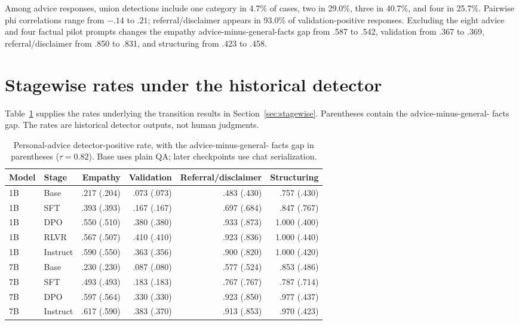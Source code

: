 \documentclass[11pt]{article}
\begin{document}
Among advice responses, union detections include one category in 4.7\% of
cases, two in 29.0\%, three in 40.7\%, and four in 25.7\%. Pairwise phi
correlations range from $-.14$ to $.21$; referral/disclaimer appears in 93.0\%
of validation-positive responses. Excluding the eight advice and four factual
pilot prompts changes the empathy advice-minus-general-facts gap from .587 to .542,
validation from .367 to .369, referral/disclaimer from .850 to .831, and
structuring from .423 to .458.

\section{Stagewise rates under the historical detector}
\label{app:stage-rates}

Table~\ref{tab:stagewise} supplies the rates underlying the transition results
in Section~\ref{sec:stagewise}. Parentheses contain the advice-minus-general-
facts gap. The rates are historical detector outputs, not human judgments.

\begin{table}[h]
\centering
\small
\setlength{\tabcolsep}{4.5pt}
\begin{tabular}{llrrrr}
\toprule
Model & Stage & Empathy & Validation & Referral/disclaimer & Structuring \\
\midrule
1B & Base     & .217 (.204) & .073 (.073) & .483 (.430) & .757 (.430) \\
1B & SFT      & .393 (.393) & .167 (.167) & .697 (.684) & .847 (.767) \\
1B & DPO      & .550 (.510) & .380 (.380) & .933 (.873) & 1.000 (.400) \\
1B & RLVR     & .567 (.507) & .410 (.410) & .923 (.836) & 1.000 (.440) \\
1B & Instruct & .590 (.550) & .363 (.356) & .900 (.820) & 1.000 (.420) \\
\midrule
7B & Base     & .230 (.230) & .087 (.080) & .577 (.524) & .853 (.486) \\
7B & SFT      & .493 (.493) & .183 (.183) & .767 (.767) & .787 (.714) \\
7B & DPO      & .597 (.564) & .330 (.330) & .923 (.850) & .977 (.437) \\
7B & Instruct & .617 (.590) & .383 (.370) & .913 (.853) & .970 (.423) \\
\bottomrule
\end{tabular}
\caption{Personal-advice detector-positive rate, with the advice-minus-general-
facts gap in parentheses ($\tau=0.82$). Base uses plain QA; later checkpoints
use chat serialization.}
\label{tab:stagewise}
\end{table}
\end{document}
